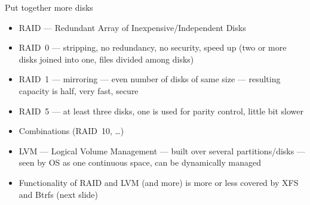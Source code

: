 \documentclass[compress, ucs, xelatex, 11pt, xcolor=svgnames,
  hyperref={
    bookmarks=true,
    unicode=true,
    colorlinks=true,
    pdftitle={Linux, command line and MetaCentrum},
    plainpages=false,
    pdfauthor={Vojtech Zeisek},
    pdfsubject={Course about use of Linux command line, writing shell scripts and using MetaCentrum of CESNET},
    pdfcreator={XeLaTeX, http://www.xelatex.org/},
    pdfkeywords={Linux, GNU, BASH, shell, command line, MetaCentrum},
    linkcolor=Sienna,
    anchorcolor=black,
    citecolor=green,
    filecolor=magenta,
    menucolor=Sienna,
    urlcolor=cyan,
    pdftex},
  url={hyphens, lowtilde} %
  ]{beamer}
\begin{document}
\begin{frame}{Put together more disks}
\begin{itemize}
  \item RAID --- Redundant Array of Inexpensive/Independent Disks
  \item RAID~0 --- stripping, no redundancy, no security, speed up (two or more disks joined into one, files divided among disks)
  \item RAID~1 --- mirroring --- even number of disks of same size --- resulting capacity is half, very fast, secure
  \item RAID~5 --- at least three disks, one is used for parity control, little bit slower
  \item Combinations (RAID~10, \ldots)
  \item LVM --- Logical Volume Management --- built over several partitions/disks --- seen by OS as one continuous space, can be dynamically managed
  \item Functionality of RAID and LVM (and more) is more or less covered by XFS and Btrfs (next slide)
\end{itemize}
\end{frame}
\end{document}
